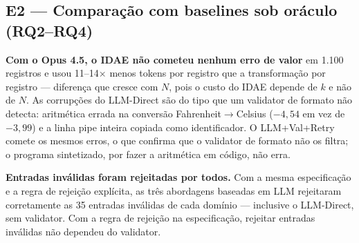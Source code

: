 \documentclass[sigconf,nonacm]{acmart}
\begin{document}
\subsection{E2 --- Comparação com baselines sob oráculo (RQ2--RQ4)}

\begin{table}[h]
\caption{E2 --- Opus 4.5. IDAE e Schema-Based no fluxo completo ($n=550$); LLM-Direct e LLM+Val+Retry na subamostra ($n=150$). Máximo de ``Correto'' possível: 90,9\% (fluxo) e 76,7\% (subamostra).}
\label{tab:e2}
\end{table}

\textbf{Com o Opus 4.5, o IDAE não cometeu nenhum erro de valor} em 1.100 registros e usou 11--14$\times$ menos tokens por registro que a transformação por registro --- diferença que cresce com $N$, pois o custo do IDAE depende de $k$ e não de $N$. As corrupções do LLM-Direct são do tipo que um validator de formato não detecta: aritmética errada na conversão Fahrenheit$\to$Celsius ($-4{,}54$ em vez de $-3{,}99$) e a linha pipe inteira copiada como identificador. O LLM+Val+Retry comete os mesmos erros, o que confirma que o validator de formato não os filtra; o programa sintetizado, por fazer a aritmética em código, não erra.

\textbf{Entradas inválidas foram rejeitadas por todos.} Com a mesma especificação e a regra de rejeição explícita, as três abordagens baseadas em LLM rejeitaram corretamente as 35 entradas inválidas de cada domínio --- inclusive o LLM-Direct, sem validator. Com a regra de rejeição na especificação, rejeitar entradas inválidas não dependeu do validator.
\end{document}
